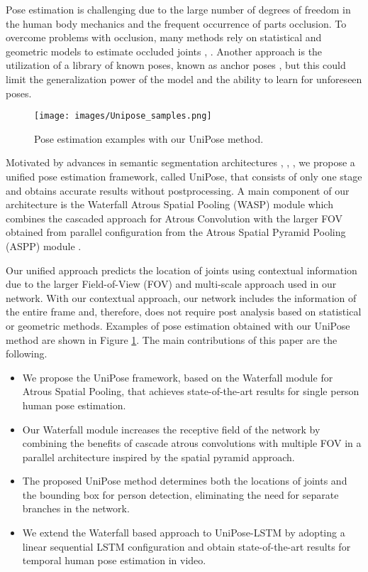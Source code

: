 \documentclass[10pt,twocolumn,letterpaper]{article}
\begin{document}
Pose estimation is challenging due to
the large number of degrees of freedom in the human body mechanics and the frequent occurrence of parts occlusion.
To overcome problems with occlusion, many methods rely on statistical and geometric models to estimate occluded joints \cite{GeometricPose}, \cite{StatisticalPose}. Another approach is the utilization of a library of known poses, known as anchor poses \cite{LCR-Net}, but this could limit the generalization power of the model and the ability to learn for unforeseen poses.

\begin{figure}[t]
\begin{center}
\texttt{[image: images/Unipose\_samples.png]}
\end{center}
  \caption{Pose estimation examples with our UniPose method.}
\label{fig:samples}
\end{figure}

Motivated by advances in semantic segmentation architectures \cite{Rethinking}, \cite{DilatedConv}, \cite{Enet}, 
we propose a unified pose estimation framework, called UniPose, that consists of only one stage and obtains accurate results without postprocessing.
A main component of our architecture is the Waterfall Atrous Spatial Pooling (WASP) module
which combines the cascaded approach for Atrous Convolution with the larger FOV obtained from parallel configuration from the Atrous Spatial Pyramid Pooling (ASPP) module \cite{DeepLab}. 

Our unified approach predicts the location of joints using contextual information due to the larger Field-of-View (FOV) and multi-scale approach used in our network. 
With our contextual approach, our network includes the information of the entire frame and, therefore, does not require post analysis based on statistical or geometric methods. Examples of pose estimation obtained with our UniPose method are shown in Figure \ref{fig:samples}.
The main contributions of this paper are the following.
\begin{itemize}
\vspace{-0.07in}
\item We propose the UniPose framework, based on the Waterfall module for Atrous Spatial Pooling, that achieves state-of-the-art results for single person human pose estimation.
\vspace{-0.08in}
\item Our Waterfall module increases the receptive field of the network by combining the benefits of cascade atrous convolutions with multiple FOV in a parallel architecture inspired by the spatial pyramid approach.
\vspace{-0.08in}
\item The proposed UniPose method determines both the  locations of joints and the bounding box for person detection, eliminating the need for 
separate branches in the network.
\vspace{-0.08in}
\item We extend the Waterfall based approach to UniPose-LSTM  by adopting a linear sequential LSTM configuration and obtain state-of-the-art results for temporal human pose estimation in video.
\end{itemize}
\end{document}
